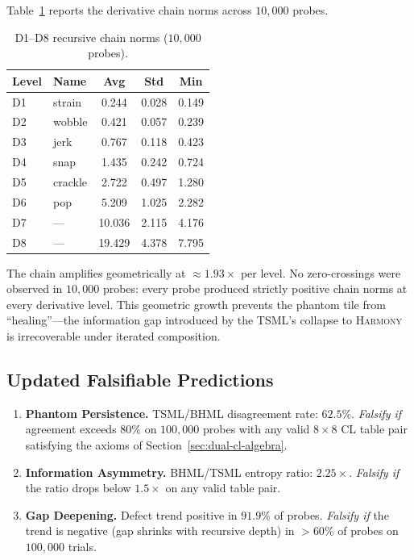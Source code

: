 \documentclass[11pt]{article}
\theoremstyle{definition}
\theoremstyle{remark}
\begin{document}
Table~\ref{tab:pnp-chain} reports the derivative chain norms across $10{,}000$ probes.

\begin{table}[ht]
\centering
\caption{D1--D8 recursive chain norms ($10{,}000$ probes).}
\label{tab:pnp-chain}
\begin{tabular}{llccc}
\toprule
Level & Name & Avg & Std & Min \\
\midrule
D1 & strain  &  0.244 & 0.028 & 0.149 \\
D2 & wobble  &  0.421 & 0.057 & 0.239 \\
D3 & jerk    &  0.767 & 0.118 & 0.423 \\
D4 & snap    &  1.435 & 0.242 & 0.724 \\
D5 & crackle &  2.722 & 0.497 & 1.280 \\
D6 & pop     &  5.209 & 1.025 & 2.282 \\
D7 & ---     & 10.036 & 2.115 & 4.176 \\
D8 & ---     & 19.429 & 4.378 & 7.795 \\
\bottomrule
\end{tabular}
\end{table}

\noindent
The chain amplifies geometrically at $\approx 1.93\times$ per level.  No zero-crossings were observed in $10{,}000$ probes: every probe produced strictly positive chain norms at every derivative level.  This geometric growth prevents the phantom tile from ``healing''---the information gap introduced by the TSML's collapse to \textsc{Harmony} is irrecoverable under iterated composition.

\subsection{Updated Falsifiable Predictions}
\label{ssec:pnp-predictions}

\begin{enumerate}
  \item \textbf{Phantom Persistence.}\;
        TSML/BHML disagreement rate: $62.5\%$.
        \emph{Falsify if} agreement exceeds $80\%$ on $100{,}000$ probes
        with any valid $8\times 8$ CL table pair satisfying the axioms of
        Section~\ref{sec:dual-cl-algebra}.

  \item \textbf{Information Asymmetry.}\;
        BHML/TSML entropy ratio: $2.25\times$.
        \emph{Falsify if} the ratio drops below $1.5\times$ on any valid
        table pair.

  \item \textbf{Gap Deepening.}\;
        Defect trend positive in $91.9\%$ of probes.
        \emph{Falsify if} the trend is negative (gap shrinks with recursive
        depth) in $> 60\%$ of probes on $100{,}000$ trials.
\end{enumerate}
\end{document}
